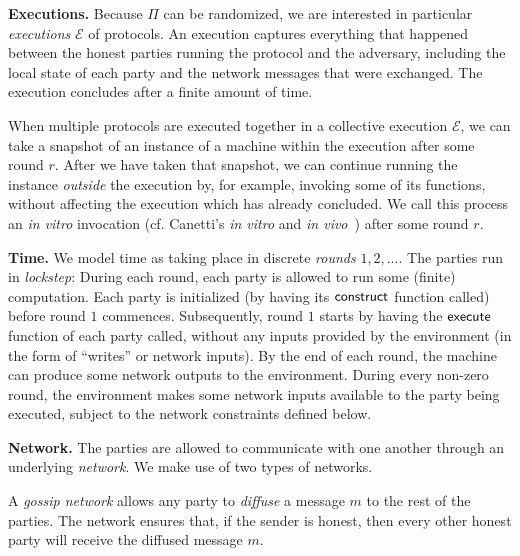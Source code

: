 \noindent
\textbf{Executions.}
Because $\Pi$ can be randomized, we are interested in particular
\emph{executions} $\mathcal{E}$ of protocols. An execution captures
everything that happened between the honest parties running the
protocol and the adversary, including the local state of each
party and the network messages that were exchanged. The execution
concludes after a finite amount of time.

\begin{definition}
When multiple protocols are executed together in a collective execution
$\mathcal{E}$, we can take a snapshot of an instance of a machine within
the execution after some round $r$. After we have taken that snapshot, we
can continue running the instance \emph{outside} the execution by, for
example, invoking some of its functions, without affecting the execution
which has already concluded. We call this process an \emph{in vitro}
invocation (cf. Canetti's \emph{in vitro} and \emph{in vivo}~\cite{uc})
after some round $r$.
\end{definition}

\noindent
\textbf{Time.}
We model time as taking place in discrete \emph{rounds} $1, 2, \ldots$.
The parties run in \emph{lockstep}:
During each round, each party is allowed to run some (finite) computation.
Each party is initialized (by having its $\textsf{construct}$ function called)
before round $1$ commences.
Subsequently, round $1$ starts by having the $\textsf{execute}$ function of each
party called, without any inputs provided by the environment (in the form
of ``writes'' or network inputs).
By the end of each round, the machine can produce some network outputs
to the environment. During every non-zero round, the environment
makes some network inputs available to the party being executed,
subject to the network constraints defined below.

\noindent
\textbf{Network.}
The parties are allowed to communicate with one another through an
underlying \emph{network}. We make use of two types of networks.

\begin{definition}
  A \emph{gossip network}
  allows any party to \emph{diffuse} a message $m$ to the rest of the parties.
  The network ensures that, if the sender is honest, then every other honest party
  will receive the diffused message $m$.
\end{definition}

